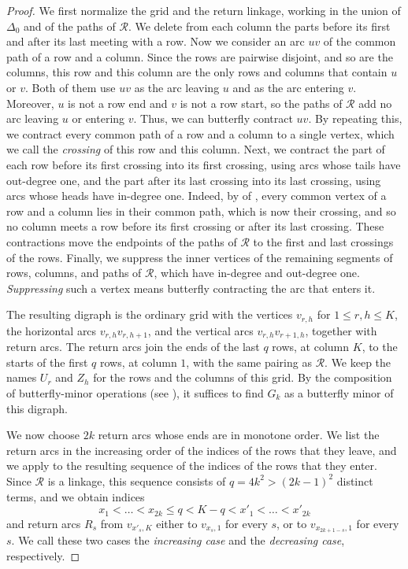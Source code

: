 \documentclass[fontsize=12pt,leading=14pt]{fullpaper}
\newcommand{\Rcal}{\mathcal{R}}
\begin{document}
\begin{proof}
  We first normalize the grid and the return linkage, working in the union of $\Delta_0$ and of the paths of $\Rcal$.
  We delete from each column the parts before its first and after its last meeting with a row.
  Now we consider an arc $uv$ of the common path of a row and a column.
  Since the rows are pairwise disjoint, and so are the columns, this row and this column are the only rows and columns that contain $u$ or $v$.
  Both of them use $uv$ as the arc leaving $u$ and as the arc entering $v$.
  Moreover, $u$ is not a row end and $v$ is not a row start, so the paths of $\Rcal$ add no arc leaving $u$ or entering $v$.
  Thus, we can butterfly contract $uv$.
  By repeating this, we contract every common path of a row and a column to a single vertex, which we call the \emph{crossing} of this row and this column.
  Next, we contract the part of each row before its first crossing into its first crossing, using arcs whose tails have out-degree one, and the part after its last crossing into its last crossing, using arcs whose heads have in-degree one.
  Indeed, by  of , every common vertex of a row and a column lies in their common path, which is now their crossing, and so no column meets a row before its first crossing or after its last crossing.
  These contractions move the endpoints of the paths of $\Rcal$ to the first and last crossings of the rows.
  Finally, we suppress the inner vertices of the remaining segments of rows, columns, and paths of $\Rcal$, which have in-degree and out-degree one.
  \emph{Suppressing} such a vertex means butterfly contracting the arc that enters it.

  The resulting digraph is the ordinary grid with the vertices $v_{r,h}$ for $1\le r,h\le K$, the horizontal arcs $v_{r,h}v_{r,h+1}$, and the vertical arcs $v_{r,h}v_{r+1,h}$, together with return arcs.
  The return arcs join the ends of the last $q$ rows, at column $K$, to the starts of the first $q$ rows, at column $1$, with the same pairing as $\Rcal$.
  We keep the names $U_r$ and $Z_h$ for the rows and the columns of this grid.
  By the composition of butterfly-minor operations (see ), it suffices to find $G_k$ as a butterfly minor of this digraph.

  We now choose $2k$ return arcs whose ends are in monotone order.
  We list the return arcs in the increasing order of the indices of the rows that they leave, and we apply  to the resulting sequence of the indices of the rows that they enter.
  Since $\Rcal$ is a linkage, this sequence consists of $q=4k^2>(2k-1)^2$ distinct terms, and we obtain indices
  \[
    x_1<\dots<x_{2k}\le q<K-q<x'_1<\dots<x'_{2k}
  \]
  and return arcs $R_s$ from $v_{x'_s,K}$ either to $v_{x_s,1}$ for every $s$, or to $v_{x_{2k+1-s},1}$ for every $s$.
  We call these two cases the \emph{increasing case} and the \emph{decreasing case}, respectively.


\end{proof}
\end{document}
